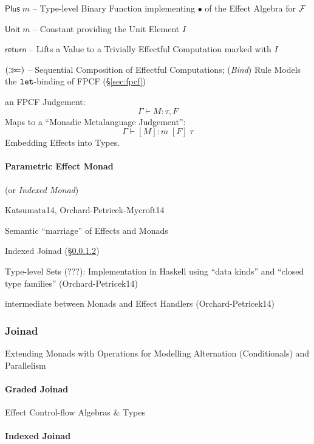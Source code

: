 $\mathsf{Plus}\;m$ -- Type-level Binary Function implementing $\bullet$
of the Effect Algebra for $\mathcal{F}$

$\mathsf{Unit}\;m$ -- Constant providing the Unit Element $I$

$\mathsf{return}$ -- Lifts a Value to a Trivially Effectful
Computation marked with $I$

$(\mathsf{\gg\kern-3pt=})$ -- Sequential Composition of Effectful Computations;
(\emph{Bind}) Rule Models the $\mathtt{let}$-binding of FPCF
(\S\ref{sec:fpcf})

an FPCF Judgement:
\[
  \Gamma \vdash M:\tau,F
\]
Maps to a ``Monadic Metalanguage Judgement'': %
\[
  \Gamma \vdash [M]:m\;[F]\;\tau
\]
Embedding Effects into Types. \cite{wadler-thiemann03}




\paragraph{Parametric Effect Monad}
\label{sec:parametric_effect_monad} \hfill

(or \emph{Indexed Monad})

Katsumata14, Orchard-Petricek-Mycroft14

Semantic ``marriage'' of Effects and Monads

Indexed Joinad (\S\ref{sec:indexed_joinad})

Type-level Sets (???): Implementation in Haskell using ``data kinds''
and ``closed type families'' (Orchard-Petricek14) %

intermediate between Monads and Effect Handlers (Orchard-Petricek14)



\subsubsection{Joinad}\label{sec:joinad}

Extending Monads with Operations for Modelling Alternation
(Conditionals) and Parallelism



\paragraph{Graded Joinad}\label{sec:graded_joinad}\hfill

Effect Control-flow Algebras \& Types



\paragraph{Indexed Joinad}\label{sec:indexed_joinad}\hfill

